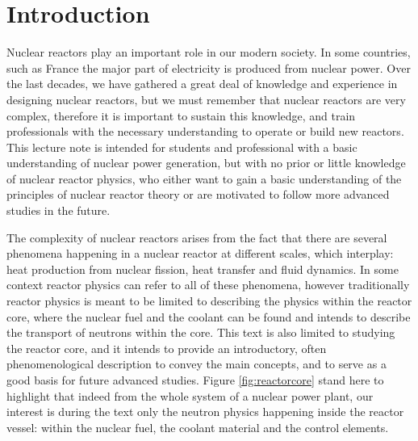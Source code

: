 %
% 
%
%
%
%
%

\section{Introduction}

Nuclear reactors play an important role in our modern society. In some countries, such as France  the major part of electricity is produced from nuclear power. Over the last decades, we have gathered a great deal of knowledge and experience in designing nuclear reactors, but we must remember that nuclear reactors are very complex, therefore it is important to sustain this knowledge, and train professionals with the necessary understanding to operate or build new reactors. This lecture note is intended for students and professional with a basic understanding of nuclear power generation, but with no prior or little knowledge of nuclear reactor physics, who either want to gain a basic understanding of the principles of nuclear reactor theory or are motivated to follow more advanced studies in the future.

The complexity of nuclear reactors arises from the fact that there are several phenomena happening in a nuclear reactor at different scales, which interplay: heat production from nuclear fission, heat transfer and fluid dynamics. In some context reactor physics can refer to all of these phenomena, however traditionally reactor physics is meant to be limited to describing the physics within the reactor core, where the nuclear fuel and the coolant can be found and intends to describe the transport of neutrons within the core. This text is also limited to studying the reactor core, and it intends to provide an introductory, often phenomenological description to convey the main concepts, and to serve as a good basis for future advanced studies. Figure \ref{fig:reactorcore} stand here to highlight that indeed from the whole system of a nuclear power plant, our interest is during the text only the neutron physics happening inside the reactor vessel: within the nuclear fuel, the coolant material and the control elements. 

